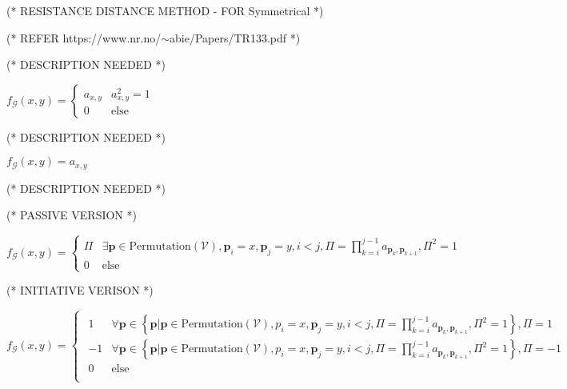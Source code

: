 \documentclass{article}
\begin{document}
(* RESISTANCE DISTANCE METHOD - FOR Symmetrical *)



(* REFER https://www.nr.no/$\sim $abie/Papers/TR133.pdf *)





(* DESCRIPTION NEEDED *)

\(f_{\mathcal{G}}(x,y)=\begin{cases}
 a_{x,y} & a_{x,y}^2=1 \\
 0 & \text{else}
\end{cases}\)





(* DESCRIPTION NEEDED *)

\(f_{\mathcal{G}}(x,y)=a_{x,y}\)





(* DESCRIPTION NEEDED *)



(* PASSIVE VERSION *)

\(f_{\mathcal{G}}(x,y)=\begin{cases}
 \Pi  & \exists \pmb{p}\in \text{Permutation}(\mathcal{V}),\pmb{p}_i=x,\pmb{p}_j=y,i<j,\Pi =\prod _{k=i}^{j-1} a_{\pmb{p}_k,\pmb{p}_{k+1}},\Pi ^2=1
\\
 0 & \text{else}
\end{cases}\)



(* INITIATIVE VERISON *)





\(f_{\mathcal{G}}(x,y)=\begin{cases}
 
\begin{array}{ll}
 1 & \forall \pmb{p}\in \left\{\pmb{p}|\pmb{p}\in \text{Permutation}(\mathcal{V}),p_i=x,\pmb{p}_j=y,i<j,\Pi =\prod _{k=i}^{j-1} a_{\pmb{p}_k,\pmb{p}_{k+1}},\Pi
^2=1\right\},\Pi =1 \\
 -1 & \forall \pmb{p}\in \left\{\pmb{p}|\pmb{p}\in \text{Permutation}(\mathcal{V}),p_i=x,\pmb{p}_j=y,i<j,\Pi =\prod _{k=i}^{j-1} a_{\pmb{p}_k,\pmb{p}_{k+1}},\Pi
^2=1\right\},\Pi =-1 \\
 0 & \text{else} \\
\end{array}

\end{cases}\)
\end{document}
